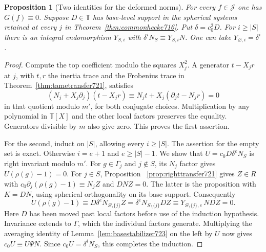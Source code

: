 \documentclass[a4paper,11pt]{article}
\newtheorem{proposition}{Proposition}[section]
\theoremstyle{definition}
\theoremstyle{remark}
\numberwithin{equation}{section}
\begin{document}
\begin{proposition}[Two identities for the deformed norms]
\leavevmode\label{prop:normfactor723}
For every \(f\in\mathcal J\) one has \(G(f)\equiv0\).
Suppose \(D\in\mathbb T\) has base-level support in the
spherical systems retained at every \(j\) in
Theorem~\ref{thm:commonhecke716}. Put \(\delta=c_0^2D\).
For \(i\ge |S|\) there is an integral endomorphism \(Y_{S,i}\)
with \(\delta^iN_S\equiv Y_{S,i}N\). One can take
\(Y_{\varnothing,i}=\delta^i\).
\end{proposition}
\begin{proof}
Compute the top coefficient modulo the squares \(X_j^2\).
A generator \(t-X_j r\) at \(j\), with \(t,r\) the inertia
trace and the Frobenius trace in Theorem~\ref{thm:tametransfer721},
satisfies
\[
   (N_j+X_j\partial_j)(t-X_jr)
       \equiv N_j t +X_j(\partial_jt-N_jr)=0
\]
in that quotient modulo \(m'\), for both conjugate choices.
Multiplication by any polynomial in \(\mathbb T[X]\) and
the other local factors preserves the equality. Generators
divisible by \(m\) also give zero. This proves the first assertion.

For the second, induct on \(|S|\), allowing every \(i\ge|S|\).
The assertion for the empty set is exact. Otherwise
\(i=e+1\) and \(e\ge|S|-1\). We show that
\(U=c_0D\delta^e N_S\) is right invariant modulo \(m'\).
For \(g\in\Gamma_j\) and \(j\notin S\), its \(N_j\) factor
gives \(U(\rho(g)-1)=0\). For \(j\in S\), Proposition
~\ref{prop:righttransfer721} gives \(Z\in R\) with
\(c_0\partial_j(\rho(g)-1)\equiv N_j Z\) and \(DNZ=0\).
The latter is the proposition with \(K=DN\), using spherical
orthogonality on its base support. Consequently
\[
 U(\rho(g)-1)\equiv
     D\delta^e N_{S\setminus\{j\}}Z
     =\delta^e N_{S\setminus\{j\}}D Z
     \equiv Y_{S\setminus\{j\},e}\,N D Z=0 .
\]
Here \(D\) has been moved past local factors before use of the
induction hypothesis. Invariance extends to \(\Gamma\), which
the individual factors generate. Multiplying the averaging
identity of Lemma~\ref{lem:basestabilizer723} on the left by
\(U\) now gives \(c_0U\equiv U\Psi N\).
Since \(c_0 U=\delta^i N_S\), this completes the induction.
\end{proof}
\end{document}
